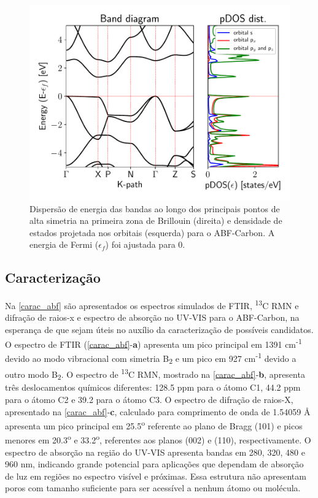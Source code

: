 		
		\begin{figure}[!ht]
			\centering
			\includegraphics[width=.7\linewidth]{capitulos/fig/results2/band_structure}
			\caption{Dispersão de energia das bandas ao longo dos principais pontos de alta simetria na primeira zona de Brillouin (direita) e densidade de estados projetada nos orbitais (esquerda) para o ABF-Carbon. A energia de Fermi ($\epsilon_f$) foi ajustada para 0.}
			\label{band_ABF}
		\end{figure}
		
	\subsection{Caracterização}
		
		Na \autoref{carac_abf} são apresentados os espectros simulados de FTIR, \textsuperscript{13}C RMN e difração de raios-x e espectro de absorção no UV-VIS para o ABF-Carbon, na esperança de que sejam úteis no auxílio da caracterização de possíveis candidatos. O espectro de FTIR (\autoref{carac_abf}-\textbf{a}) apresenta um pico principal em 1391 cm\textsuperscript{-1} devido ao modo vibracional com simetria B\textsubscript{2} e um pico  em 927 cm\textsuperscript{-1} devido a outro modo B\textsubscript{2}. O espectro de \textsuperscript{13}C RMN, mostrado na \autoref{carac_abf}-\textbf{b}, apresenta três deslocamentos químicos diferentes: 128.5 ppm para o átomo C1, 44.2 ppm para o átomo C2 e 39.2 para o átomo C3. O espectro de difração de raios-X, apresentado na \autoref{carac_abf}-\textbf{c}, calculado para comprimento de onda de 1.54059 Å apresenta um pico principal em 25.5\textsuperscript{o} referente ao plano de Bragg (101) e picos menores em 20.3\textsuperscript{o} e 33.2\textsuperscript{o}, referentes aos planos (002) e (110), respectivamente. O espectro de absorção na região do UV-VIS apresenta bandas em 280, 320, 480 e 960 nm, indicando grande potencial para aplicações que dependam de absorção de luz em regiões no espectro visível e próximas. Essa estrutura não apresentam poros com tamanho suficiente para ser acessível a nenhum átomo ou molécula. 
	
